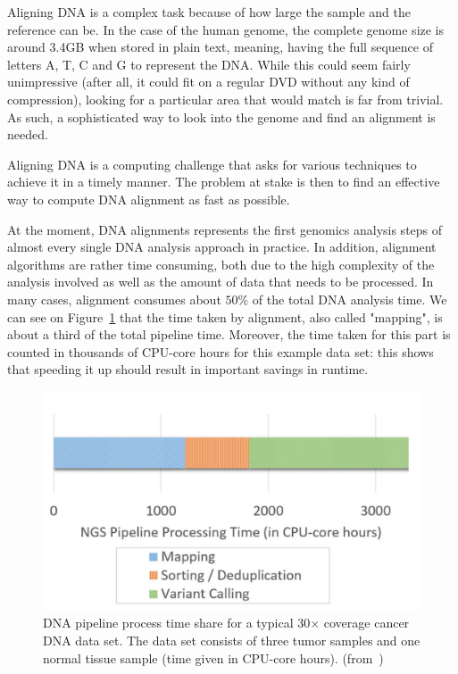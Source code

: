 Aligning DNA is a complex task because of how large the sample and the reference can be. In the case of the human genome, the complete genome size is around 3.4GB when stored in plain text, meaning, having the full sequence of letters A, T, C and G to represent the DNA. While this could seem fairly unimpressive (after all, it could fit on a regular DVD without any kind of compression), looking for a particular area that would match is far from trivial. As such, a sophisticated way to look into the genome and find an alignment is needed.

Aligning DNA is a computing challenge that asks for various techniques to achieve it in a timely manner. The problem at stake is then to find an effective way to compute DNA alignment as fast as possible.

At the moment, DNA alignments represents the first genomics analysis steps of almost every single DNA analysis approach in practice. In addition, alignment algorithms are rather time consuming, both due to the high complexity of the analysis involved as well as the amount of data that needs to be processed. In many cases, alignment consumes about $50\%$ of the total DNA analysis time. We can see on Figure~\ref{fig:pipelineprocesstime} that the time taken by alignment, also called "mapping", is about a third of the total pipeline time. Moreover, the time taken for this part is counted in thousands of CPU-core hours for this example data set: this shows that speeding it up should result in important savings in runtime.

\begin{figure}[h]
	\centering
	\includegraphics[width=1\linewidth]{pipelineprocesstime}
	\caption{DNA pipeline process time share for a typical 30$\times$ coverage cancer DNA data set. The data set consists of three tumor samples and one normal tissue sample (time given in CPU-core hours). (from~\cite{HOUTGAST201854})}
	\label{fig:pipelineprocesstime}
\end{figure}


